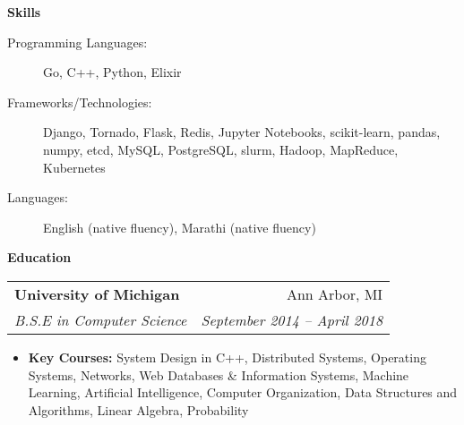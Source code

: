 \documentclass[letterpaper,11pt]{article}
\makeatletter
\newcommand{\resitem}[1]{\item #1 \vspace{-2pt}}
\newcommand{\resheading}[1]{{\large \colorbox{mygrey}{\begin{minipage}{\textwidth}{\textbf{#1 \vphantom{p\^{E}}}}\end{minipage}}}}
\newcommand{\ressubheading}[4]{
\begin{tabular*}{6.875in}{l@{\extracolsep{\fill}}r}
		\textbf{#1} & #2 \\
		\textit{#3} & \textit{#4} \\
\end{tabular*}\vspace{-6pt}}
\renewcommand{\footnotesize}{\fontsize{10pt}{11pt}\selectfont}
\makeatother
\begin{document}
		\resheading{Skills}
		\begin{description}
			\item[Programming Languages:]
			{	
				\footnotesize
				Go, C++, Python, Elixir
			}
			\item[Frameworks/Technologies:]
			{
				\footnotesize
				Django, Tornado, Flask, Redis, Jupyter Notebooks, scikit-learn, pandas, numpy, etcd, MySQL, PostgreSQL, slurm, Hadoop, MapReduce, Kubernetes
			}
			\item[Languages:]
			{
				\footnotesize
				English (native fluency), Marathi (native fluency)
			}
		\end{description} %
		\resheading{Education}
		\begin{description}
			\item
			\ressubheading{{University of Michigan}}{Ann Arbor, MI}{B.S.E in Computer Science}{September 2014 -- April 2018}
			{ \footnotesize
				\begin{itemize}
					\resitem{\textbf{Key Courses:}
						System Design in C++,
						Distributed Systems,
						Operating Systems, 
						Networks,
						Web Databases \& Information Systems,
						Machine Learning,
						Artificial Intelligence,
						Computer Organization,
						Data Structures and Algorithms,
						Linear Algebra,
						Probability
					}
				\end{itemize}
			}
		\end{description} %
						
						
\end{document}

